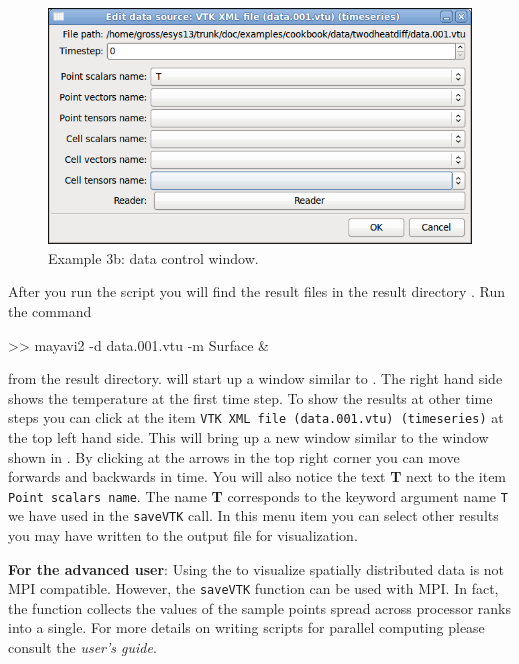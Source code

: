 \begin{figure}[ht]
\centerline{\includegraphics[width=4.in]{figures/ScreeshotMayavi2n2}}
\caption{Example 3b: \mayavi data control window.}
\label{fig:mayavi window2}
\end{figure}
After you run the script you will find the 
result files  in the result directory .
Run the 
command
\begin{python}
>> mayavi2 -d data.001.vtu -m Surface &
\end{python}
from the result directory. \mayavi will start up a window similar to
.
The right hand side shows the temperature at the first time step. To show
the results at other time steps you can click at the item \texttt{VTK XML file
(data.001.vtu) (timeseries)}
at the top left hand side. This will bring up a new window similar to the window
shown in  . By clicking at the arrows in the top
right corner you can move forwards and backwards in time. 
You will also notice the text \textbf{T} next to the item \texttt{Point scalars
name}. The
name \textbf{T} corresponds to the keyword argument name \texttt{T} we have
used 
in the \verb|saveVTK| call. In this menu item you can select other results 
you may have written to the output file for visualization.

\textbf{For the advanced user}: Using the \modmpl to visualize spatially
distributed data 
is not MPI compatible. However, the \verb|saveVTK| function can be used with
MPI. In fact,
the function collects the values of the sample points spread across processor
ranks into a single.
For more details on writing scripts for parallel computing please consult the
\emph{user's guide}.